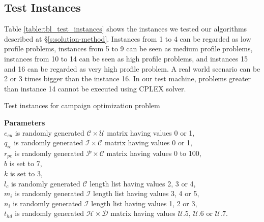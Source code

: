 \documentclass[11pt]{article}
\begin{document}
\subsection{Test Instances} \label{test_cases}
Table \ref{table:tbl_test_instances} shows the instances we tested our algorithms described at \S \ref{s:solution-method}. Instances from 1 to 4 can be regarded as low profile problems, instances from 5 to 9 can be seen as medium profile problems, instances from 10 to 14 can be seen as high profile problems, and instances 15 and 16 can be regarded as very high profile problem. A real world scenario can be 2 or 3 times bigger than the instance 16. In our test machine, problems greater than instance 14 cannot be executed using CPLEX solver.\\
 
\begin{table}[htb]
    \centering
    \caption[Short Caption for LoT]{Test instances for campaign optimization problem}\label{table:tbl_test_instances}
\end{table}

\noindent \textbf{Parameters}\\

\noindent $e_{{c}{u}}$ is randomly generated $\mathcal{C} \times \mathcal{U}$ matrix having values 0 or 1,\\
\noindent $q_{{i}{c}}$ is randomly generated $\mathcal{I} \times \mathcal{C}$ matrix having values 0 or 1,\\
\noindent $r_{{p}{c}}$ is randomly generated $\mathcal{P} \times \mathcal{C}$ matrix having values 0 to 100,\\
\noindent $b$ is set to 7,\\
\noindent $k$ is set to 3,\\
\noindent $l_c$ is randomly generated $\mathcal{C}$ length list having values 2, 3 or 4,\\
\noindent $m_i$ is randomly generated $\mathcal{I}$ length list having values 3, 4 or 5,\\
\noindent $n_i$ is randomly generated $\mathcal{I}$ length list having values 1, 2 or 3,\\
\noindent $t_{{h}{d}}$ is randomly generated $\mathcal{H} \times \mathcal{D}$ matrix having values $\mathcal{U}.5$, $\mathcal{U}.6$ or $\mathcal{U}.7$.\\
\end{document}
